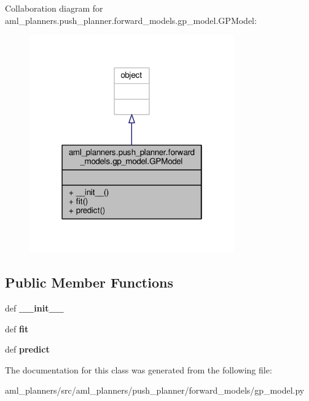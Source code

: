 Collaboration diagram for aml\-\_\-planners.\-push\-\_\-planner.\-forward\-\_\-models.\-gp\-\_\-model.\-G\-P\-Model\-:
\nopagebreak
\begin{figure}[H]
\begin{center}
\leavevmode
\includegraphics[width=250pt]{classaml__planners_1_1push__planner_1_1forward__models_1_1gp__model_1_1_g_p_model__coll__graph}
\end{center}
\end{figure}
\subsection*{Public Member Functions}
\begin{DoxyCompactItemize}
\item 
\hypertarget{classaml__planners_1_1push__planner_1_1forward__models_1_1gp__model_1_1_g_p_model_adccf633c02f85d4857f089d091c98c30}{def {\bfseries \-\_\-\-\_\-init\-\_\-\-\_\-}}\label{classaml__planners_1_1push__planner_1_1forward__models_1_1gp__model_1_1_g_p_model_adccf633c02f85d4857f089d091c98c30}

\item 
\hypertarget{classaml__planners_1_1push__planner_1_1forward__models_1_1gp__model_1_1_g_p_model_aa4d91e4b6384f2eeb961bfea087d631d}{def {\bfseries fit}}\label{classaml__planners_1_1push__planner_1_1forward__models_1_1gp__model_1_1_g_p_model_aa4d91e4b6384f2eeb961bfea087d631d}

\item 
\hypertarget{classaml__planners_1_1push__planner_1_1forward__models_1_1gp__model_1_1_g_p_model_aef716b47cb802713bd09e9265b3ed541}{def {\bfseries predict}}\label{classaml__planners_1_1push__planner_1_1forward__models_1_1gp__model_1_1_g_p_model_aef716b47cb802713bd09e9265b3ed541}

\end{DoxyCompactItemize}


The documentation for this class was generated from the following file\-:\begin{DoxyCompactItemize}
\item 
aml\-\_\-planners/src/aml\-\_\-planners/push\-\_\-planner/forward\-\_\-models/gp\-\_\-model.\-py\end{DoxyCompactItemize}
